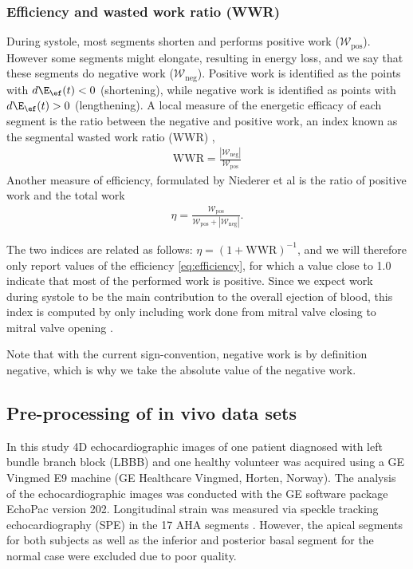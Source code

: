 \subsubsection{Efficiency and wasted work ratio (WWR)}
\label{sec:efficiency_wwr}

During systole, most segments shorten and performs positive work
($\mathcal{W}_{\mathrm{pos}}$). However some segments might elongate,
resulting in energy loss, and we say that these segments do negative work
($\mathcal{W}_{\mathrm{neg}}$). Positive work is identified as the points with
$d\E_{\ef}(t) < 0$ (shortening), while negative work is identified as points with
$d\E_{\ef}(t) > 0$ (lengthening).
A local measure of the energetic efficacy of each segment is the ratio between the
negative and positive work, an index known as the segmental wasted
work ratio (WWR) \cite{russell2013assessment},
\begin{align}
  \mathrm{WWR} = \frac{|\mathcal{W}_{\mathrm{neg}}|}{\mathcal{W}_{\mathrm{pos}}}
\end{align}
Another measure of efficiency, formulated by Niederer et al
\cite{niederer2009role} is the ratio of positive work and the total
work
\begin{align}
  \eta = \frac{\mathcal{W}_{\mathrm{pos}}}{\mathcal{W}_{\mathrm{pos}} + |\mathcal{W}_{\mathrm{neg}}|}.
  \label{eq:efficiency}
\end{align}

The two indices are related as follows: $\eta = \left( 1 +
  \mathrm{WWR} \right)^{-1}$, and we will therefore only report values
of the efficiency \eqref{eq:efficiency}, for which a value close to 1.0 indicate that most
of the performed work is positive. Since we expect work during systole
to be the main contribution to the overall ejection of blood, this
index is computed by only including work done from mitral valve closing to
mitral valve opening \cite{russell2013assessment}. 

Note that with the current sign-convention, negative work is by
definition negative, which is why we take the absolute value of the
negative work. 

\subsection{Pre-processing of in vivo data sets}

In this study 4D echocardiographic images of one patient diagnosed
with left bundle branch block (LBBB) and one healthy volunteer was
acquired using a GE Vingmed E9 machine (GE Healthcare Vingmed, Horten,
Norway). 
The analysis of the echocardiographic images was conducted with the
GE software package EchoPac version 202. Longitudinal strain was
measured via speckle tracking echocardiography (SPE) in the 17 AHA segments
\cite{cerqueira2002standardized}. However, the apical segments for both
subjects as well as the inferior and posterior basal segment for the
normal case were excluded due to poor quality.


